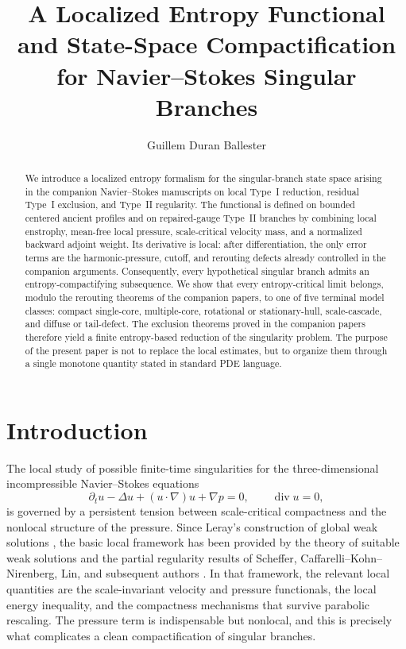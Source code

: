 \documentclass[11pt]{amsart}
\title[Localized entropy and compactification]
{A Localized Entropy Functional and State-Space Compactification \\
for Navier--Stokes Singular Branches}
\author{Guillem Duran Ballester}
\date{}
\numberwithin{equation}{section}
\theoremstyle{plain}
\theoremstyle{definition}
\theoremstyle{remark}
\newcommand{\diver}{\operatorname{div}}
\begin{document}
\begin{abstract}
We introduce a localized entropy formalism for the singular-branch state space
arising in the companion Navier--Stokes manuscripts on local Type~I reduction,
residual Type~I exclusion, and Type~II regularity.  The functional is defined
on bounded centered ancient profiles and on repaired-gauge Type~II branches by
combining local enstrophy, mean-free local pressure, scale-critical velocity
mass, and a normalized backward adjoint weight.  Its derivative is local: after
differentiation, the only error terms are the harmonic-pressure, cutoff, and
rerouting defects already controlled in the companion arguments.  Consequently,
every hypothetical singular branch admits an entropy-compactifying subsequence.
We show that every entropy-critical limit belongs, modulo the rerouting
theorems of the companion papers, to one of five terminal model classes:
compact single-core, multiple-core, rotational or stationary-hull,
scale-cascade, and diffuse or tail-defect.  The exclusion theorems proved in
the companion papers therefore yield a finite entropy-based reduction of the
singularity problem.  The purpose of the present paper is not to replace the
local estimates, but to organize them through a single monotone quantity stated
in standard PDE language.
\end{abstract}

\maketitle
\tableofcontents

\section{Introduction}

The local study of possible finite-time singularities for the three-dimensional
incompressible Navier--Stokes equations
\begin{equation}\label{eq:NS}
	\partial_t u - \Delta u + (u\cdot\nabla)u + \nabla p = 0,
	\qquad \diver u = 0,
\end{equation}
is governed by a persistent tension between scale-critical compactness and the
nonlocal structure of the pressure.  Since Leray's construction of global weak
solutions \cite{Leray1934}, the basic local framework has been provided by the
theory of suitable weak solutions and the partial regularity results of
Scheffer, Caffarelli--Kohn--Nirenberg, Lin, and subsequent authors
\cite{Scheffer1976,CKN1982,Lin1998,GustafsonKangTsai2007}.  In that framework,
the relevant local quantities are the scale-invariant velocity and pressure
functionals, the local energy inequality, and the compactness mechanisms that
survive parabolic rescaling.  The pressure term is indispensable but nonlocal,
and this is precisely what complicates a clean compactification of singular
branches.
\end{document}
